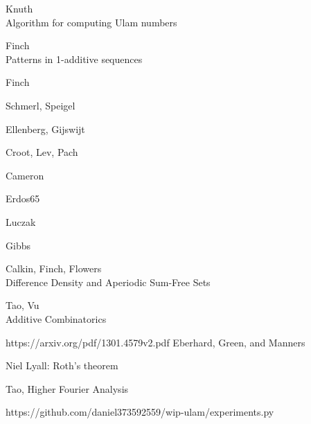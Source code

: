 \documentclass{article}
\theoremstyle{definition}
\theoremstyle{remark}
\numberwithin{equation}{section}
\begin{document}
{\begin{thebibliography}{9}
Knuth\\
Algorithm for computing Ulam numbers
 
Finch\\
Patterns in 1-additive sequences
 
Finch
 
Schmerl, Speigel
 
Ellenberg, Gijswijt

Croot, Lev, Pach

Cameron

Erdos65

Luczak

Gibbs

Calkin, Finch, Flowers\\
Difference Density and Aperiodic Sum-Free Sets 

Tao, Vu\\
Additive Combinatorics

  https://arxiv.org/pdf/1301.4579v2.pdf Eberhard, Green, and Manners

  Niel Lyall: Roth's theorem 

  Tao, Higher Fourier Analysis

  https://github.com/daniel373592559/wip-ulam/experiments.py

\end{thebibliography}

}
\end{document}
